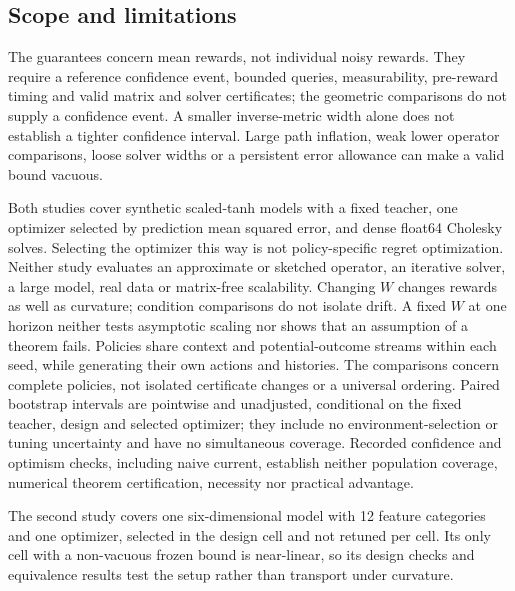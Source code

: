 \subsection{Scope and limitations}\label{sec:scope-limitations}

The guarantees concern mean rewards, not individual noisy rewards. They require
a reference confidence event, bounded queries, measurability, pre-reward
timing and valid matrix and solver certificates; the geometric comparisons do
not supply a confidence event. A smaller inverse-metric width alone does not
establish a tighter confidence interval. Large path inflation, weak lower
operator comparisons, loose solver widths or a persistent error allowance can
make a valid bound vacuous.

Both studies cover synthetic scaled-tanh models with a fixed teacher, one
optimizer selected by prediction mean squared error, and dense float64
Cholesky solves. Selecting the optimizer this way is not policy-specific regret
optimization. Neither study evaluates an approximate or sketched operator, an
iterative solver, a large model, real data or matrix-free scalability.
Changing $W$ changes rewards as well as curvature; condition comparisons do not
isolate drift. A fixed $W$ at one horizon neither tests asymptotic scaling nor
shows that an assumption of a theorem fails. Policies share context and
potential-outcome streams within each seed, while generating their own actions
and histories. The comparisons concern complete
policies, not isolated certificate changes or a universal ordering. Paired
bootstrap intervals are pointwise and unadjusted, conditional on the fixed
teacher, design and selected optimizer; they include no environment-selection
or tuning uncertainty and have no simultaneous coverage. Recorded confidence and
optimism checks, including naive current, establish neither population
coverage, numerical theorem certification, necessity nor practical advantage.

The second study covers one six-dimensional model with 12 feature categories
and one optimizer, selected in the design cell and not retuned per cell. Its
only cell with a non-vacuous frozen bound is near-linear, so its design checks
and equivalence results test the setup rather than transport under curvature.
